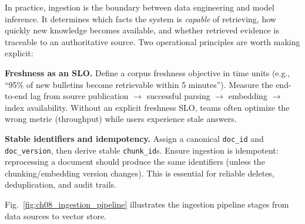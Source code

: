 In practice, ingestion is the boundary between data engineering and model inference. It determines which facts the system is \emph{capable} of retrieving, how quickly new knowledge becomes available, and whether retrieved evidence is traceable to an authoritative source. Two operational principles are worth making explicit:

\textbf{Freshness as an SLO.} Define a corpus freshness objective in time units (e.g., ``95\% of new bulletins become retrievable within 5 minutes''). Measure the end-to-end lag from source publication $\rightarrow$ successful parsing $\rightarrow$ embedding $\rightarrow$ index availability. Without an explicit freshness SLO, teams often optimize the wrong metric (throughput) while users experience stale answers.

\textbf{Stable identifiers and idempotency.} Assign a canonical \texttt{doc\_id} and \texttt{doc\_version}, then derive stable \texttt{chunk\_id}s. Ensure ingestion is idempotent: reprocessing a document should produce the same identifiers (unless the chunking/embedding version changes). This is essential for reliable deletes, deduplication, and audit trails.

Fig.~\ref{fig:ch08_ingestion_pipeline} illustrates the ingestion pipeline stages from data sources to vector store.

